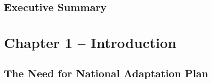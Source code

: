 \documentclass[
]{book}
\begin{document}
\hypertarget{executive-summary}{%
\section{Executive Summary}\label{executive-summary}}

\hypertarget{chapter-1-introduction}{%
\chapter{Chapter 1 -- Introduction}\label{chapter-1-introduction}}

\hypertarget{the-need-for-national-adaptation-plan}{%
\section{The Need for National Adaptation Plan}\label{the-need-for-national-adaptation-plan}}
\end{document}
